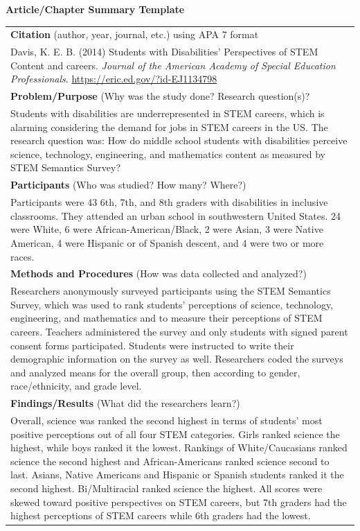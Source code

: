\documentclass[11.5pt]{sig-alternate}
\begin{document}
\begin{large}
\textbf{Article/Chapter Summary Template}
\begin{table}
\begin{tabular}{|l|}
\hline
\textbf{Citation} (author, year, journal, etc.) using APA 7 format \\ 
Davis, K. E. B. (2014) Students with Disabilities' Perspectives of STEM Content and careers. \textit{Journal of the American Academy of Special Education Professionals}. \url{https://eric.ed.gov/?id-EJ1134798} \\ \hline
\textbf{Problem/Purpose} (Why was the study done? Research question(s)? \\
Students with disabilities are underrepresented in STEM careers, which is alarming considering the demand for jobs in STEM careers in the US. The research question was: How do middle school students with disabilities perceive science, technology, engineering, and mathematics content as measured by STEM Semantics Survey? \\ \hline
\textbf{Participants} (Who was studied? How many? Where?) \\
Participants were 43 6th, 7th, and 8th graders with disabilities in inclusive classrooms. They attended an urban school in southwestern United States. 24 were White, 6 were African-American/Black, 2 were Asian, 3 were Native American, 4 were Hispanic or of Spanish descent, and 4 were two or more races. \\ \hline
\textbf{Methods and Procedures} (How was data collected and analyzed?) \\
Researchers anonymously surveyed participants using the STEM Semantics Survey, which was used to rank students' perceptions of science, technology, engineering, and mathematics and to measure their perceptions of STEM careers. Teachers administered the survey and only students with signed parent consent forms participated. Students were instructed to write their demographic information on the survey as well. Researchers coded the surveys and analyzed means for the overall group, then according to gender, race/ethnicity, and grade level. \\ \hline
\textbf{Findings/Results} (What did the researchers learn?) \\
Overall, science was ranked the second highest in terms of students' most positive perceptions out of all four STEM categories. Girls ranked science the highest, while boys ranked it the lowest. Rankings of White/Caucasians ranked science the second highest and African-Americans ranked science second to last. Asians, Native Americans and Hispanic or Spanish students ranked it the second highest. Bi/Multiracial ranked science the highest. All scores were skewed toward positive perspectives on STEM careers, but 7th graders had the highest perceptions of STEM careers while 6th graders had the lowest. \\ \hline

\end{tabular}
\end{table}
\end{large}
\end{document}
